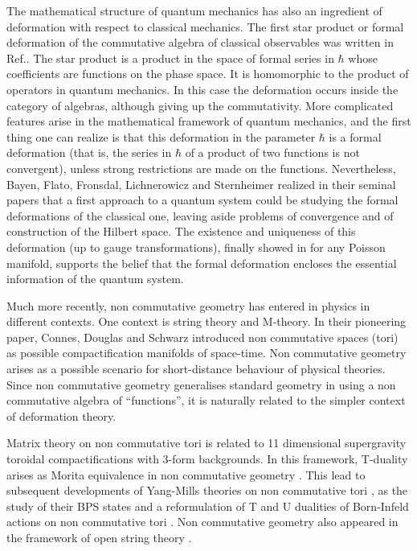 \documentclass[a4paper,12pt]{article}
\begin{document}
The mathematical structure of quantum mechanics has also an ingredient of 
deformation with respect to classical mechanics. The first star product
or formal deformation of the commutative algebra of classical observables
was written in 
Ref.\cite{m}. The star product is a product in the space of formal series
in $\hbar$         
whose coefficients are   functions on the  phase space. It  is homomorphic
to the product of 
operators in quantum mechanics. In this case the deformation occurs inside 
 the category of algebras, although giving up the commutativity. 
 More complicated features arise in the mathematical framework of quantum
mechanics, and 
the first thing one can realize is that this deformation in the parameter
$\hbar$ is a formal
 deformation (that is, the series in $\hbar$ of a product of two functions
is not convergent),
unless strong restrictions are made on the  functions. Nevertheless, 
Bayen, Flato, Fronsdal, Lichnerowicz and Sternheimer realized in their
seminal papers \cite{bffls}
that a first approach to a quantum system could be studying  the formal
deformations of 
the classical one, leaving aside problems of convergence and of
construction of the Hilbert space.
The existence and  uniqueness of this deformation (up to gauge
transformations), finally showed in
\cite{ko} for any Poisson manifold,  supports the belief that the formal
deformation encloses 
the essential information of the quantum system. 
 
Much more recently, non commutative geometry has entered in physics in
different 
contexts. One context is string theory and M-theory. In their pioneering
paper, Connes, Douglas 
and Schwarz \cite{cds} introduced non commutative spaces  (tori) as
possible 
compactification manifolds of space-time. Non commutative geometry  arises
as a possible
scenario for short-distance behaviour of physical theories. Since non
commutative 
geometry generalises standard geometry in using a non commutative algebra
of 
``functions'', it is naturally related to the simpler context of
deformation theory.

Matrix theory \cite{bfss, ikkt}
 on non commutative tori is 
  related 
to 11 dimensional supergravity toroidal compactifications with 3-form
backgrounds.
In this framework, T-duality arises as Morita equivalence in non
commutative geometry
\cite{rs}. This lead to subsequent developments of Yang-Mills theories on
non commutative 
tori \cite{mz}, as the  study of their BPS states \cite{bm} and a
reformulation of T and U dualities
of Born-Infeld actions on non commutative tori \cite{hv}. Non commutative
geometry also appeared
in the framework of open string theory \cite{dh}.
\end{document}
